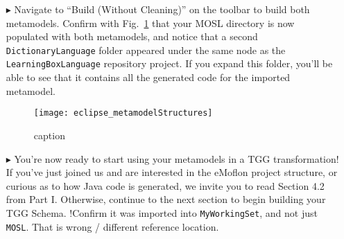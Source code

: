 \begin{itemize}
\item[$\blacktriangleright$] Navigate to ``Build (Without Cleaning)'' on the toolbar to build both metamodels. Confirm with
Fig.~\ref{fig:bothmetamodelstructures} that your MOSL directory is now populated with both metamodels, and notice that a second \texttt{Dictionary\-Language}
folder appeared under the same node as the \texttt{LearningBoxLanguage} repository project. If you expand this folder, you'll be able to see that it contains
all the generated code for the imported metamodel.

\begin{figure}[htbp]
\begin{center}
  \texttt{[image: eclipse\_metamodelStructures]}
  \caption{caption}
  \label{fig:bothmetamodelstructures}
\end{center}
\end{figure}

\item[$\blacktriangleright$] You're now ready to start using your metamodels in a TGG transformation! If you've just joined us and are interested in the eMoflon
project structure, or curious as to how Java code is generated, we invite you to read Section 4.2 from Part I. Otherwise, continue to the next section to begin
building your TGG Schema. !Confirm it was imported into \texttt{MyWorkingSet}, and not just \texttt{MOSL}. That is wrong / different reference location.

\end{itemize}
